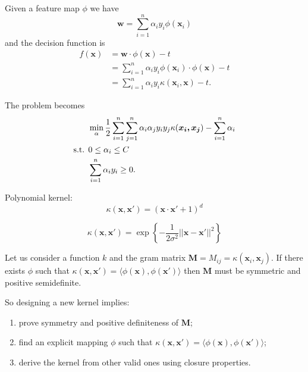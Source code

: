 \documentclass[a4paper,9pt]{extarticle}
\begin{document}
\begin{multicols*}{2}
Given a feature map $\phi$ we have 
\begin{equation*}
	\bm{w}=\sum_{i=1}^{n}\alpha_{i}y_{i}\phi(\bm{x}_{i})
\end{equation*}
and the decision function is
\begin{align*}
	f(\bm{x})&=\bm{w}\cdot\phi(\bm{x})-t\\
	&=\sum_{i=1}^{n}\alpha_{i}y_{i}\phi(\bm{x}_{i})\cdot\phi(\bm{x})-t\\
	&=\sum_{i=1}^{n}\alpha_{i}y_{i}\kappa(\bm{x}_{i},\bm{x})-t.
\end{align*}
\begin{riquadro}
	The problem becomes
	\begin{align*}
		&\min_{\alpha}\frac{1}{2}\sum_{i=1}^{n}\sum_{j=1}^{n}\alpha_{i}\alpha_{j}y_{i}y_{j}\kappa(\bm{x_{i},\bm{x_{j}}})-\sum_{i=1}^{n}\alpha_{i}\\
		\text{s.t. }&0\leq\alpha_{i}\leq C\\
	&\sum_{i=1}^{n}\alpha_{i}y_{i}\geq0.
	\end{align*}
\end{riquadro}
Polynomial kernel:
\begin{equation*}
	\kappa(\bm{x},\bm{x'})=(\bm{x}\cdot\bm{x'}+1)^{d}
\end{equation*}
\begin{riquadro}
	\begin{equation*}
		\kappa(\bm{x},\bm{x'})=\exp\left\{-\frac{1}{2\sigma^{2}}\lvert\lvert\bm{x}-\bm{x'}\rvert\rvert^{2}\right\}
	\end{equation*}
\end{riquadro}
\begin{riquadro}
	Let us consider a function $k$ and the gram matrix $\mathbf{M}=M_{ij}=\kappa(\bm{x}_{i},\bm{x}_{j})$. If there exists $\phi$ such that $\kappa(\bm{x},\bm{x'})=\langle\phi(\bm{x}),\phi(\bm{x'})\rangle$ then $\mathbf{M}$ must be symmetric and positive semidefinite.
\end{riquadro}
So designing a new kernel implies:
\begin{enumerate}
	\item prove symmetry and positive definiteness of $\mathbf{M}$;
	\item find an explicit mapping $\phi$ such that $\kappa(\bm{x},\bm{x'})=\langle\phi(\bm{x}),\phi(\bm{x'})\rangle$;
	\item derive the kernel from other valid ones using closure properties.
\end{enumerate}

\end{multicols*}
\end{document}
